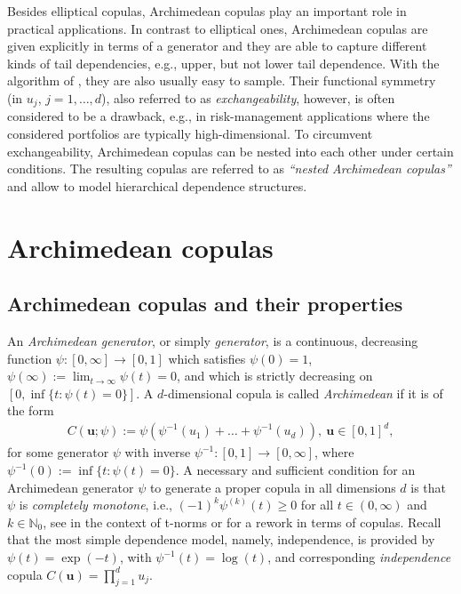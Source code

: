 \documentclass[nojss,article]{jss}
\theoremstyle{mythmstyle}
\newcommand*{\IN}{\mathbb{N}}
\newcommand*{\psii}{{\psi^{-1}}}
\newcommand*{\textcite}[2][]{\citet[#1]{#2}}
\begin{document}
Besides elliptical copulas, Archimedean copulas play an important role in
practical applications. In contrast to elliptical ones, Archimedean copulas
are given explicitly in terms of a generator and they are able to capture
different kinds of tail dependencies, e.g., upper, but not lower tail
dependence. With the algorithm of \textcite{marshallolkin1988}, they are
also usually easy to sample. Their functional symmetry (in $u_j$,
$j=1,\dots,d$), also referred to as \textit{exchangeability}, however, is often considered to be a drawback, e.g.,
in risk-management applications where the considered portfolios are
typically high-dimensional. To circumvent exchangeability, Archimedean copulas
can be nested into each other under certain conditions. The resulting
copulas are referred to as \emph{``nested Archimedean copulas''} and allow to model
hierarchical dependence structures.

\section{Archimedean copulas}
\subsection{Archimedean copulas and their properties}
An \textit{Archimedean generator}, or simply \textit{generator}, is a
continuous, decreasing function $\psi:[0,\infty]\to[0,1]$ which satisfies
$\psi(0)=1$, $\psi(\infty):=\lim_{t\to\infty}\psi(t)=0$, and which is strictly
decreasing on $[0,\inf\{t:\psi(t)=0\}]$. A $d$-dimensional copula is called
\textit{Archimedean} if it is of the form
\begin{align}
  C(\bm{u};\psi):=\psi(\psii(u_1)+\dots+\psii(u_d)),\ \bm{u}\in[0,1]^d,\label{ac}
\end{align}
for some generator $\psi$ with inverse $\psii:[0,1]\to[0,\infty]$, where
$\psii(0):=\inf\{t:\psi(t)=0\}$. A necessary and sufficient condition for
an Archimedean generator $\psi$ to generate a proper copula in all
dimensions $d$ is that $\psi$ is \textit{completely monotone}, i.e.,
$(-1)^k\psi^{(k)}(t)\ge0$ for all $t\in(0,\infty)$ and $k\in\IN_0$, see
\textcite{kimberling1974} in the context of t-norms or
\textcite[p.\ 54]{hofert2010c} for a rework in terms of copulas.
Recall that the most simple dependence model, namely, independence, is provided
by $\psi(t)=\exp(-t)$, with $\psii(t)=\log(t)$, and corresponding
\textit{independence} copula $C({\bm u})=\prod_{j=1}^d u_j$.
\end{document}
